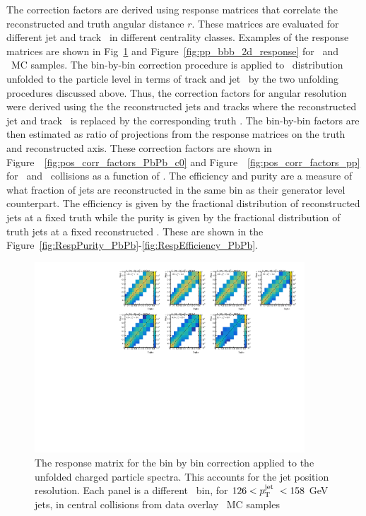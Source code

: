 The correction factors are derived using response matrices that correlate the reconstructed and truth angular distance $r$.
These matrices are evaluated for different jet and track \pT\ in different centrality classes.
Examples of the response matrices are shown in Fig~\ref{fig:PbPb_bbb_2d_response} and Figure~\ref{fig:pp_bbb_2d_response} for \pbpb\ and \pp\ MC samples.
The bin-by-bin correction procedure is applied to \Dptr\ distribution unfolded to the particle level in terms of track and jet \pT\ by the two unfolding procedures discussed above.
Thus, the correction factors for angular resolution were derived using the the reconstructed jets and tracks where the reconstructed jet and track \pT\ is replaced by the corresponding truth \pT.
The bin-by-bin factors are then estimated as ratio of projections from the response matrices on the truth and reconstructed axis.
These correction factors are shown in Figure~~\ref{fig:pos_corr_factors_PbPb_c0} and Figure~~\ref{fig:pos_corr_factors_pp} for \pbpb\ and \pp\ collisions as a function of \rvar.
The efficiency and purity are a measure of what fraction of jets are reconstructed in the same bin as their generator level counterpart.
The efficiency is given by the fractional distribution of reconstructed jets at a fixed truth \ptjet while the purity is given by the fractional distribution of truth jets at a fixed reconstructed \ptjet.
These are shown in the Figure~\ref{fig:RespPurity_PbPb}-\ref{fig:RespEfficiency_PbPb}.



\begin{figure}
\centering
\includegraphics[page=1, width=0.9\textwidth]{figures/main/corrections/ShapeResponse2D_PbPb.pdf}
\caption{The response matrix for the bin by bin correction applied to the unfolded charged particle spectra.
This accounts for the jet position resolution.
Each panel is a different \pttrk\ bin, for $126 < \mbox{$p_{\mathrm{T}}^{\mathrm{jet}}$}\ < 158$ GeV jets, in central collisions from data overlay \pbpb\ MC samples}
\label{fig:PbPb_bbb_2d_response}
\end{figure}

